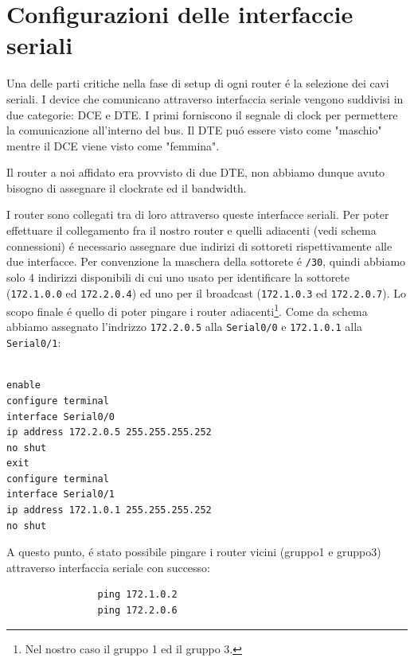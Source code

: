 \documentclass[9pt, a4paper, oneside]{article}
\begin{document}
		\section{Configurazioni delle interfaccie seriali}
			\par
				Una delle parti critiche nella fase di setup di ogni router \'e la selezione dei cavi seriali. I device che comunicano attraverso interfaccia seriale vengono suddivisi in due categorie: DCE e DTE. I primi forniscono il segnale di clock per permettere la comunicazione all'interno del bus. Il DTE pu\'o essere visto come "maschio" mentre il DCE viene visto come "femmina".
				\par
				Il router a noi affidato era provvisto di due DTE, non abbiamo dunque avuto bisogno di assegnare il clockrate ed il bandwidth.
				\par
				I router sono collegati tra di loro attraverso queste 
				interfacce seriali. Per poter effettuare il 
				collegamento fra il nostro router e quelli 
				adiacenti (vedi schema connessioni) \'e necessario 
				assegnare due indirizi di sottoreti 
				rispettivamente alle due interfacce.
				Per convenzione la maschera della sottorete 
				\'e \texttt{/30}, quindi abbiamo solo 4 indirizzi 
				disponibili di cui uno usato per identificare 
				la sottorete (\texttt{172.1.0.0} ed 
				\texttt{172.2.0.4}) ed uno per il broadcast 
				(\texttt{172.1.0.3} ed \texttt{172.2.0.7}). 
				Lo scopo finale \'e quello di poter pingare i 
				router adiacenti\footnote{Nel nostro caso il 
				gruppo 1 ed il gruppo 3.}. Come da schema 
				abbiamo assegnato l'indrizzo \texttt{172.2.0.5}
				alla \texttt{Serial0/0} e \texttt{172.1.0.1}
				alla \texttt{Serial0/1}:
				\begin{verbatim}

enable
configure terminal
interface Serial0/0
ip address 172.2.0.5 255.255.255.252
no shut
exit
configure terminal
interface Serial0/1
ip address 172.1.0.1 255.255.255.252
no shut

				\end{verbatim}
				\par 
				A questo punto, \'e stato possibile pingare i router vicini (gruppo1 e gruppo3) attraverso interfaccia seriale con successo:
				\begin{verbatim}
				ping 172.1.0.2
				ping 172.2.0.6
				\end{verbatim}
\end{document}
